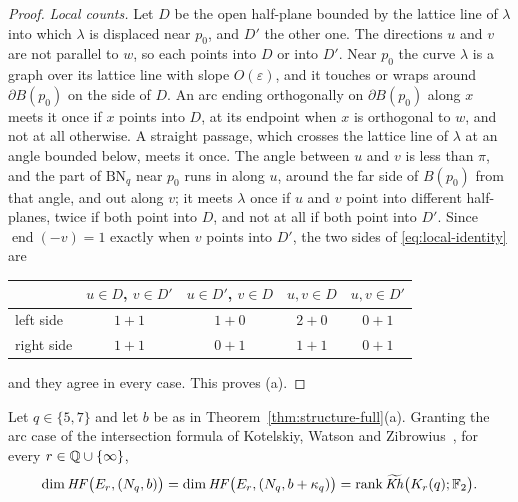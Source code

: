 \begin{proof}
\emph{Local counts.}  Let $D$ be the open half-plane bounded by the lattice line of $\lambda$ into
which $\lambda$ is displaced near $p_0$, and $D'$ the other one.  The directions $u$ and $v$ are not
parallel to $w$, so each points into $D$ or into $D'$.  Near $p_0$ the curve $\lambda$ is a graph over its lattice
line with slope $O(\varepsilon)$, and it touches or wraps around $\partial B(p_0)$ on the side of $D$.  An arc ending orthogonally on $\partial B(p_0)$ along $x$ meets it once
if $x$ points into $D$, at its endpoint when $x$ is orthogonal to $w$, and not at all otherwise.  A straight passage, which crosses the lattice line of
$\lambda$ at an angle bounded below, meets it once.  The angle between $u$ and $v$ is less than $\pi$, and
the part of $\mathrm{BN}_q$ near $p_0$ runs in along $u$, around the far side of $B(p_0)$ from that
angle, and out along $v$; it meets $\lambda$ once if $u$ and $v$ point into different half-planes,
twice if both point into $D$, and not at all if both point into $D'$.  Since
$\operatorname{end}(-v)=1$ exactly when $v$ points into $D'$, the two sides of
\eqref{eq:local-identity} are
\begin{center}
\begin{tabular}{lcccc}
\toprule
 & $u\in D$, $v\in D'$ & $u\in D'$, $v\in D$ & $u,v\in D$ & $u,v\in D'$\\
\midrule
left side & $1+1$ & $1+0$ & $2+0$ & $0+1$\\
right side & $1+1$ & $0+1$ & $1+1$ & $0+1$\\
\bottomrule
\end{tabular}
\end{center}
and they agree in every case.  This proves (a).
\end{proof}

\begin{corollary}\label{cor:closures-full}
Let $q\in\{5,7\}$ and let $b$ be as in Theorem~\ref{thm:structure-full}(a).  Granting the arc case of the
intersection formula of Kotelskiy, Watson and Zibrowius~\cite[Thm.~5.25]{KWZ}, for every
$r\in\mathbb{Q}\cup\{\infty\}$,
\[
 \dim\mathit{HF}\bigl(E_r,(N_q,b)\bigr)=\dim\mathit{HF}\bigl(E_r,(N_q,b+\kappa_q)\bigr)=\operatorname{rank}\widetilde{\mathit{Kh}}\bigl(K_r(q);\mathbb{F}_2\bigr).
\]
\end{corollary}

